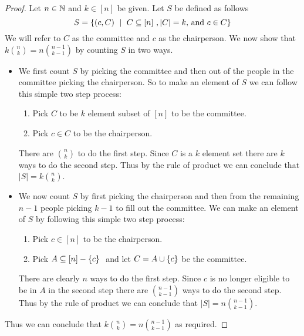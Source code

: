         \begin{proof}
            Let $n \in \mathbb{N}$ and $k \in [n]$ be given. Let $S$ be defined as follows
            \begin{equation}
                S = \Set{(c, C) \ \mid \ \subs{C}{[n]}, |C| = k \mbox{, and } c \in C}
            \end{equation}
            We will refer to $C$ as the committee and $c$ as the chairperson.
            We now show that $k \binom{n}{k} = n \binom{n - 1}{k - 1}$ by counting $S$ in
            two ways.
            \begin{itemize}
                \item
                    We first count $S$ by picking the committee and then out of the people
                    in the committee picking the chairperson. So to make an element of $S$
                    we can follow this simple two step process:
                    \begin{enumerate}
                        \item
                            Pick $C$ to be $k$ element subset of $[n]$ to be the committee.
                        \item
                            Pick $c \in C$ to be the chairperson.
                    \end{enumerate}
                    There are $\binom{n}{k}$ to do the first step. Since $C$ is a $k$
                    element set there are $k$ ways to do the second step. Thus by the
                    rule of product we can conclude that $|S| = k \binom{n}{k}$.
                \item
                    We now count $S$ by first picking the chairperson and then from the
                    remaining $n - 1$ people picking $k - 1$ to fill out the committee.
                    We can make an element of $S$ by following this simple two step process:
                    \begin{enumerate}
                        \item
                            Pick $c \in [n]$ to be the chairperson.
                        \item
                            Pick $A \subseteq [n] - \left\{c\right\} \ $ and let $C = A \cup \left\{c\right\}$
                            be the committee.
                    \end{enumerate}
                        There are clearly $n$ ways to do the first step. Since $c$ is no
                        longer eligible to be in $A$ in the second step there are $\binom{n - 1}{k - 1}$
                        ways to do the second step. Thus by the rule of product we can conclude
                        that $|S| = n \binom{n - 1}{k - 1}$.
            \end{itemize}
            Thus we can conclude that $k \binom{n}{k} = n \binom{n - 1}{k - 1}$
            as required. \QED
        \end{proof}
